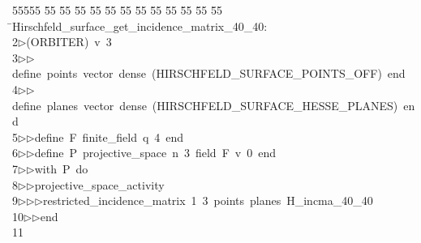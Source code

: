 %
%
\begin{tabbing}
55555 \= 55 \= 55 \= 55 \= 55 \= 55 \= 55 \= 55 \= 55 \= 55 \= 55 \= 55 \= 55 \= \>Hirschfeld\_surface\_get\_incidence\_matrix\_40\_40:\\[0pt]
2\>$\triangleright$\>(ORBITER)\ v\ 3\ \\[0pt]
3\>$\triangleright$\>$\triangleright$\>define\ points\ vector\ dense\ (HIRSCHFELD\_SURFACE\_POINTS\_OFF)\ end\ \\[0pt]
4\>$\triangleright$\>$\triangleright$\>define\ planes\ vector\ dense\ (HIRSCHFELD\_SURFACE\_HESSE\_PLANES)\ end\ \\[0pt]
5\>$\triangleright$\>$\triangleright$\>define\ F\ finite\_field\ q\ 4\ end\ \\[0pt]
6\>$\triangleright$\>$\triangleright$\>define\ P\ projective\_space\ n\ 3\ field\ F\ v\ 0\ end\ \\[0pt]
7\>$\triangleright$\>$\triangleright$\>with\ P\ do\ \\[0pt]
8\>$\triangleright$\>$\triangleright$\>projective\_space\_activity\ \\[0pt]
9\>$\triangleright$\>$\triangleright$\>$\triangleright$\>restricted\_incidence\_matrix\ 1\ 3\ points\ planes\ H\_incma\_40\_40\ \\[0pt]
10\>$\triangleright$\>$\triangleright$\>end\\[0pt]
11\>\end{tabbing}
